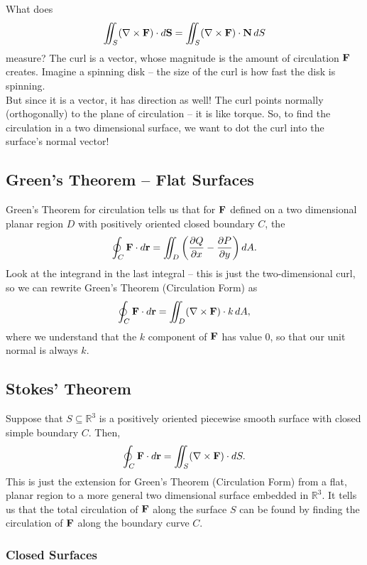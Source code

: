 What does 
\[
    \iint_S (\nabla \times \mathbf{F}) \cdot d\mathbf{S} = \iint_S (\nabla \times \mathbf{F}) \cdot \mathbf{N} \, dS
\]
measure? The curl is a vector, whose magnitude is the amount of circulation \(\mathbf{F}\) creates. Imagine a spinning disk – the size of the curl is how fast the disk is spinning. \\

But since it is a vector, it has direction as well! The curl points normally (orthogonally) to the plane of circulation – it is like torque. So, to find the circulation in a two dimensional surface, we want to dot the curl into the surface’s normal vector! 

\subsection{Green's Theorem – Flat Surfaces}

Green’s Theorem for circulation tells us that for \(\mathbf{F}\) defined on a two dimensional planar region \(D\) with positively oriented closed boundary \(C\), the
\[
    \oint_C \mathbf{F} \cdot d\mathbf{r} = \iint_D \left( \frac{\partial Q}{\partial x} - \frac{\partial P}{\partial y} \right) dA.
\]
Look at the integrand in the last integral – this is just the two-dimensional curl, so we can rewrite Green’s Theorem (Circulation Form) as
\[
    \oint_C \mathbf{F} \cdot d\mathbf{r} = \iint_D (\nabla \times \mathbf{F}) \cdot k \, dA,
\]    
where we understand that the \(k\) component of \(\mathbf{F}\) has value 0, so that our unit normal is always \(k\). \\

\subsection{Stokes' Theorem}

Suppose that \(S \subseteq \mathbb{R}^3\) is a positively oriented piecewise smooth surface with closed simple boundary \(C\). Then,
\[
    \oint_C \mathbf{F} \cdot d\mathbf{r} = \iint_S (\nabla \times \mathbf{F}) \cdot dS.
\]
This is just the extension for Green’s Theorem (Circulation Form) from a flat, planar region to a more general two dimensional surface embedded in \(\mathbb{R}^3\). It tells us that the total circulation of \(\mathbf{F}\) along the surface \(S\) can be found by finding the circulation of \(\mathbf{F}\) along the boundary curve \(C\).

\subsubsection{Closed Surfaces}

